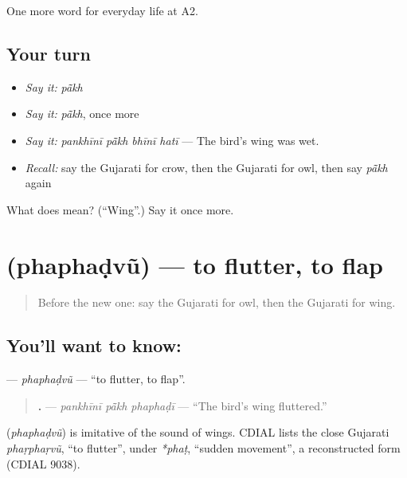 \begin{grammarlens}[title={What you've built}]
One more word for everyday life at A2.
\end{grammarlens}

\subsection*{Your turn}
\begin{itemize}
\raggedright
  \item \emph{Say it:} \emph{pā̃kh}
  \item \emph{Say it:} \emph{pā̃kh}, once more
  \item \emph{Say it:} \emph{pankhīnī pā̃kh bhīnī hatī} — The bird's wing was wet.
  \item \emph{Recall:} say the Gujarati for crow, then the Gujarati for owl, then say \emph{pā̃kh} again
\end{itemize}

\begin{tcolorbox}[breakable,colback=teal!4,colframe=teal!35!black,title={Before you move on}]
What does  mean? (\textquotedblleft{}Wing\textquotedblright{}.) Say it once more.
\end{tcolorbox}
\section[\texorpdfstring{\gu{ફફડવું} (phaphaḍvũ)}{ફફડવું (phaphaḍvũ)}]{ (phaphaḍvũ) — to flutter, to flap}

\label{lesson:GU-C237-phaphadvu}



\begin{quote}
Before the new one: say the Gujarati for owl, then the Gujarati for wing.
\end{quote}

\subsection*{You'll want to know: }
\textbf{} — \emph{phaphaḍvũ} — \textquotedblleft{}to flutter, to flap\textquotedblright{}.

\begin{quote}
\textbf{  .} — \emph{pankhīnī pā̃kh phaphaḍī} — \textquotedblleft{}The bird's wing fluttered.\textquotedblright{}
\end{quote}

\begin{cousinweb}
\textbf{} (\emph{phaphaḍvũ}) is imitative of the sound of wings. CDIAL lists the close Gujarati \emph{phaṛphaṛvũ}, \textquotedblleft{}to flutter\textquotedblright{}, under \emph{*phaṭ}, \textquotedblleft{}sudden movement\textquotedblright{}, a reconstructed form (CDIAL 9038).
\end{cousinweb}

